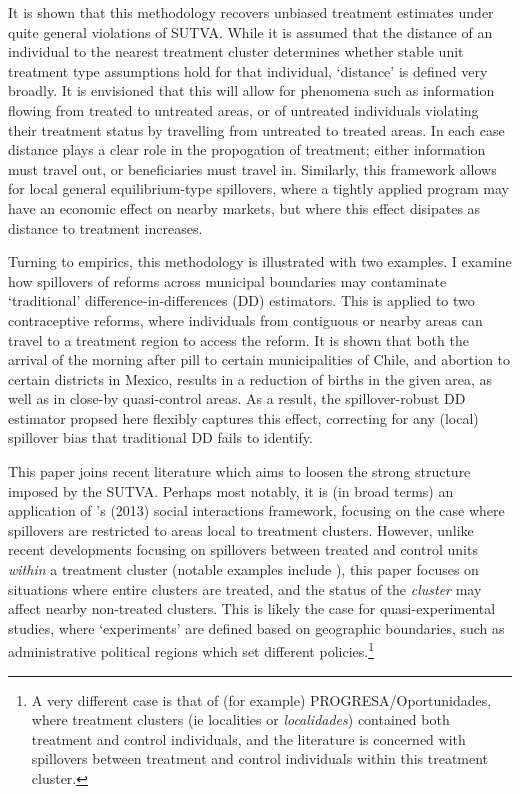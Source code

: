It is shown that this methodology recovers unbiased treatment estimates under 
quite general violations of SUTVA.  While it is assumed that the distance of 
an individual to the nearest treatment cluster determines whether stable unit 
treatment type assumptions hold for that individual, `distance' is defined 
very broadly.  It is envisioned that this will allow for phenomena such as 
information flowing from treated to untreated areas, or of untreated 
individuals violating their treatment status by travelling from untreated to
treated areas.  In each case distance plays a clear role in the propogation 
of treatment; either information must travel out, or beneficiaries must travel 
in. Similarly, this framework allows for local general equilibrium-type 
spillovers, where a tightly applied program may have an economic effect on 
nearby markets, but where this effect disipates as distance to treatment 
increases.

Turning to empirics, this methodology is illustrated with two examples.
I examine how spillovers of reforms across municipal boundaries may 
contaminate `traditional' difference-in-differences (DD) estimators.  This is 
applied to two contraceptive reforms, where individuals from contiguous or nearby 
areas can travel to a treatment region to access the reform.  It is shown that 
both the arrival of the morning after pill to certain municipalities of Chile, 
and abortion to certain districts in Mexico, results in a reduction of births in 
the given area, as well as in close-by quasi-control areas.  As a result, the 
spillover-robust DD estimator propsed here flexibly captures this effect, 
correcting for any (local) spillover bias that traditional DD fails to 
identify.

This paper joins recent literature which aims to loosen the strong structure 
imposed by the SUTVA.  Perhaps most notably, it is (in broad terms) an 
application of \citeauthor{Manski2013}'s (2013) social interactions framework, 
focusing on the case where spillovers are restricted to areas local to treatment 
clusters.  However, unlike recent developments focusing on spillovers 
between treated and control units \emph{within} a treatment cluster (notable
examples include \citet{McIntosh2008,Bairdetal2014,AngelucciDiMaro2010}), this 
paper focuses on situations where entire clusters are treated, and the status
of the \emph{cluster} may affect nearby non-treated clusters.  This is likely
the case for quasi-experimental studies, where `experiments' are defined based
on geographic boundaries, such as administrative political regions which set 
different policies.\footnote{A very different case is that of (for example)
PROGRESA/Oportunidades, where treatment clusters (ie localities or 
\emph{localidades}) contained both treatment and control individuals, and the
literature is concerned with spillovers between treatment and control individuals
within this treatment cluster.}

